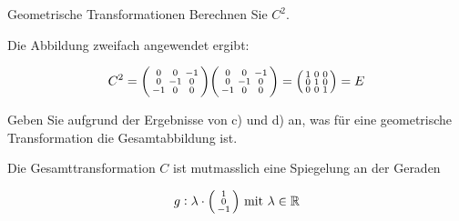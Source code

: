 \begin{example2}{Geometrische Transformationen}
Berechnen Sie $C^{2}$.

Die Abbildung zweifach angewendet ergibt:

$$
C^{2}=\begin{psmallmatrix}
    0 & 0 & -1 \\
    0 & -1 & 0 \\
    -1 & 0 & 0
\end{psmallmatrix} \begin{psmallmatrix}
    0 & 0 & -1 \\
    0 & -1 & 0 \\
    -1 & 0 & 0
\end{psmallmatrix} = \begin{psmallmatrix}
    1 & 0 & 0 \\
    0 & 1 & 0 \\
    0 & 0 & 1
\end{psmallmatrix} = E
$$

Geben Sie aufgrund der Ergebnisse von c) und d) an, was für eine geometrische Transformation die Gesamtabbildung ist.

Die Gesamttransformation $C$ ist mutmasslich eine Spiegelung an der Geraden

$$
g: \lambda \cdot \begin{psmallmatrix}
    1 \\
    0 \\
    -1
\end{psmallmatrix} \text { mit } \lambda \in \mathbb{R}
$$

\end{example2}

